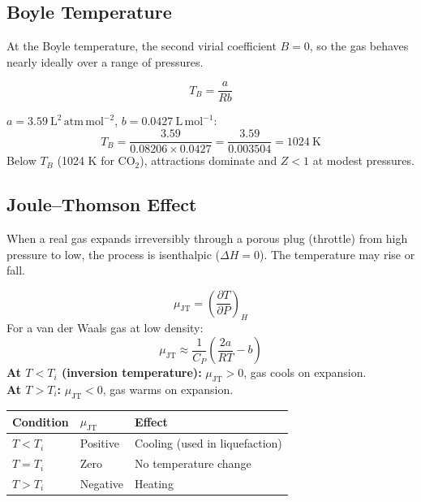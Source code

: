 \documentclass[12pt,a4paper]{article}
\begin{document}
\subsection{Boyle Temperature}
At the Boyle temperature, the second virial coefficient $B = 0$, so the gas behaves nearly ideally over a range of pressures.

\begin{tcolorbox}[formulabox, title={Boyle Temperature for a van der Waals Gas}]
\[
T_B = \frac{a}{Rb}
\]
\end{tcolorbox}

\begin{tcolorbox}[examplebox, title={Solved Example: Boyle Temperature of \texorpdfstring{$\mathrm{CO_2}$}{CO2}}]
$a=3.59\ \mathrm{L^2\,atm\,mol^{-2}}$, $b=0.0427\ \mathrm{L\,mol^{-1}}$:
\[
T_B = \frac{3.59}{0.08206\times0.0427} = \frac{3.59}{0.003504} = 1024\ \mathrm{K}
\]
Below $T_B$ (1024 K for $\mathrm{CO_2}$), attractions dominate and $Z<1$ at modest pressures.
\end{tcolorbox}

\subsection{Joule--Thomson Effect}
When a real gas expands irreversibly through a porous plug (throttle) from high pressure to low, the process is isenthalpic ($\Delta H = 0$). The temperature may rise or fall.

\begin{tcolorbox}[formulabox, title={Joule--Thomson Coefficient}]
\[
\mu_{\mathrm{JT}} = \left(\frac{\partial T}{\partial P}\right)_H
\]
For a van der Waals gas at low density:
\[
\mu_{\mathrm{JT}} \approx \frac{1}{C_P}\!\left(\frac{2a}{RT} - b\right)
\]
\textbf{At $T < T_i$ (inversion temperature):} $\mu_{\mathrm{JT}} > 0$, gas cools on expansion.\\
\textbf{At $T > T_i$:} $\mu_{\mathrm{JT}} < 0$, gas warms on expansion.
\end{tcolorbox}

\begin{tabularx}{\linewidth}{|B{3.0cm}|Y|Y|}
\hline
\textbf{Condition} & \textbf{$\mu_{\mathrm{JT}}$} & \textbf{Effect} \\
\hline
$T < T_i$ & Positive & Cooling (used in liquefaction) \\
\hline
$T = T_i$ & Zero & No temperature change \\
\hline
$T > T_i$ & Negative & Heating \\
\hline
\end{tabularx}
\end{document}

